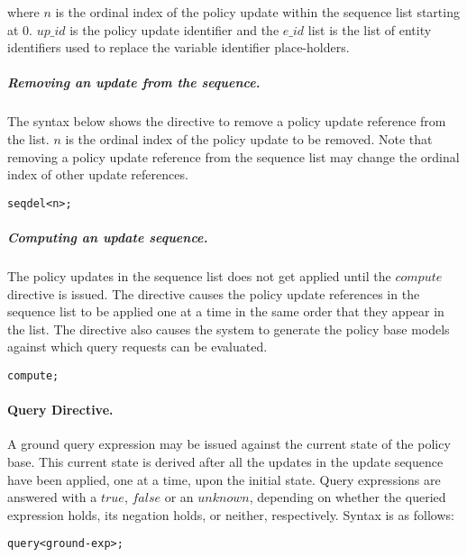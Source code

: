 \documentclass[11pt, twocolumn]{article}
\newenvironment{vverbose}
  {\begin{alltt}}
  {\vspace{-\baselineskip}\end{alltt}}
\begin{document}
          \noindent where $n$ is the ordinal index of the policy update within
          the sequence list starting at 0. $up\_id$ is the policy update
          identifier and the $e\_id$ list is the list of entity identifiers
          used to replace the variable identifier place-holders.

        \subparagraph{Removing an update from the sequence.}
          The syntax below shows the directive to remove a policy update
          reference from the list. $n$ is the ordinal index of the policy
          update to be removed. Note that removing a policy update reference
          from the sequence list may change the ordinal index of other update
          references.

          \begin{vverbose}
seq del <n>;
          \end{vverbose}

        \subparagraph{Computing an update sequence.}

          The policy updates in the sequence list does not get applied until
          the $compute$ directive is issued. The directive causes the policy
          update references in the sequence list to be applied one at a time in
          the same order that they appear in the list. The directive also
          causes the system to generate the policy base models against which
          query requests can be evaluated.

          \begin{vverbose}
compute;
          \end{vverbose}

        \paragraph{Query Directive.}

          A ground query expression may be issued against the current state of
          the policy base. This current state is derived after all the updates
          in the update sequence have been applied, one at a time, upon the
          initial state. Query expressions are answered with a $true$, $false$
          or an $unknown$, depending on whether the queried expression holds,
          its negation holds, or neither, respectively. Syntax is as follows:

          \begin{vverbose}
query <ground-exp>;
          \end{vverbose}
\end{document}
